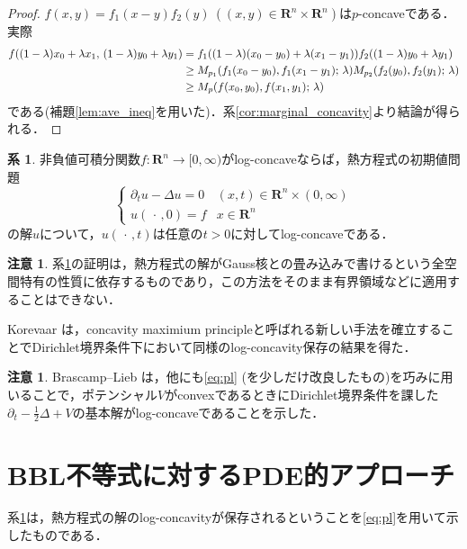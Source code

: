 \documentclass[a4j]{ltjsarticle}
\newcommand{\Rset}{\mathbf{R}}
\newcommand{\1}{\bm{1}}
\newcommand{\M}[4]{M_{#1}\qty(#2,#3;\,#4)}
\numberwithin{equation}{section}
\theoremstyle{definition}
\newtheorem{cor}[thm]{系}
\newtheorem{rmk}[thm]{注意}
\begin{document}
\begin{proof}
    $f(x,y)=f_1(x-y)f_2(y)\ ((x,y)\in \Rset^n\times\Rset^n)$は$p$-concaveである．実際
    \begin{align}
        f((1-\lambda)x_0+\lambda x_1,\,(1-\lambda)y_0+\lambda y_1)&=f_1((1-\lambda)(x_0-y_0)+\lambda(x_1-y_1))f_2((1-\lambda)y_0+\lambda y_1)\\
        &\geq \M{p_1}{f_1(x_0-y_0)}{f_1(x_1-y_1)}{\lambda}\M{p_2}{f_2(y_0)}{f_2(y_1)}{\lambda}\\
        &\geq \M{p}{f(x_0,y_0)}{f(x_1,y_1)}{\lambda}
    \end{align}
    である(補題\ref{lem:ave_ineq}を用いた)．系\ref{cor:marginal_concavity}より結論が得られる．
\end{proof}
\begin{cor}\label{cor:heat_concavity}
    非負値可積分関数$f\colon \Rset^n\to[0,\infty)$がlog-concaveならば，熱方程式の初期値問題
    \begin{equation}
        \left\{
        \begin{array}{rl}
            \partial_{t}u-\Delta u=0 & (x,t)\in\Rset^n\times (0,\infty)\\
            u(\,\cdot\,,0)=f & x\in\Rset^n
        \end{array}
        \right.
    \end{equation}
    の解$u$について，$u(\,\cdot\,,t)$は任意の$t>0$に対してlog-concaveである．
\end{cor}
\begin{rmk}
    系\ref{cor:heat_concavity}の証明は，熱方程式の解がGauss核との畳み込みで書けるという全空間特有の性質に依存するものであり，この方法をそのまま有界領域などに適用することはできない．

    Korevaar \cite{K}は，concavity maximium principleと呼ばれる新しい手法を確立することでDirichlet境界条件下において同様のlog-concavity保存の結果を得た．
\end{rmk}
\begin{rmk}
    Brascamp--Lieb \cite{BL}は，他にも\eqref{eq:pl} (を少しだけ改良したもの)を巧みに用いることで，ポテンシャル$V$がconvexであるときにDirichlet境界条件を課した$\partial_t-\frac{1}{2}\Delta +V$の基本解がlog-concaveであることを示した．
\end{rmk}
\section{BBL不等式に対するPDE的アプローチ}
系\ref{cor:heat_concavity}は，熱方程式の解のlog-concavityが保存されるということを\eqref{eq:pl}を用いて示したものである．
\end{document}
